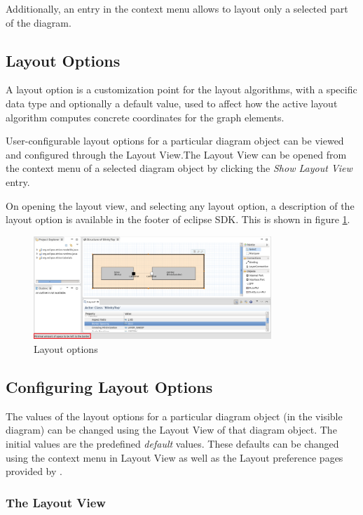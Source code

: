 Additionally, an entry in the context menu allows to layout only a selected part of the diagram.

\subsection{Layout Options}
\label{layoutOptions}

A layout option is a customization point for the layout algorithms, with a specific data type and 
optionally a default value, used to affect how the active layout algorithm computes concrete coordinates 
for the graph elements.

User-configurable layout options for a particular diagram object can be viewed and configured through the 
Layout View.The Layout View can be opened from the context menu of a selected diagram object by clicking 
the \textit{Show Layout View} entry. 

On opening the layout view, and selecting any layout option, a description of the layout option is 
available in the footer of eclipse SDK. This is shown in figure \ref{fig:layout_options}.

\begin{figure}
\includegraphics[width=0.8\textwidth]{images/043-LayoutOptionDescription.png}
\caption{Layout options}
\label{fig:layout_options}
\end{figure}

\subsection{Configuring Layout Options}
\label{configureOptions}

The values of the layout options for a particular diagram object (in the visible diagram) can be changed 
using the Layout View of that diagram object. The initial values are the predefined \emph{default} values. 
These defaults can be changed using the context menu in Layout View as well as the Layout preference pages 
provided by \eTrice{}.

\subsubsection*{The Layout View}
\label{layoutView}

